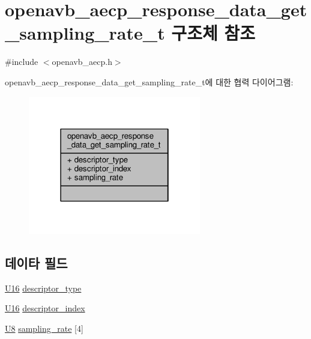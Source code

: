 \hypertarget{structopenavb__aecp__response__data__get__sampling__rate__t}{}\section{openavb\+\_\+aecp\+\_\+response\+\_\+data\+\_\+get\+\_\+sampling\+\_\+rate\+\_\+t 구조체 참조}
\label{structopenavb__aecp__response__data__get__sampling__rate__t}


{\ttfamily \#include $<$openavb\+\_\+aecp.\+h$>$}



openavb\+\_\+aecp\+\_\+response\+\_\+data\+\_\+get\+\_\+sampling\+\_\+rate\+\_\+t에 대한 협력 다이어그램\+:
\nopagebreak
\begin{figure}[H]
\begin{center}
\leavevmode
\includegraphics[width=214pt]{structopenavb__aecp__response__data__get__sampling__rate__t__coll__graph}
\end{center}
\end{figure}
\subsection*{데이타 필드}
\begin{DoxyCompactItemize}
\item 
\hyperlink{openavb__types__base__pub_8h_a0a0a322d5fa4a546d293a77ba8b4a71f}{U16} \hyperlink{structopenavb__aecp__response__data__get__sampling__rate__t_a1e231d7874aada5925b29affc76782cc}{descriptor\+\_\+type}
\item 
\hyperlink{openavb__types__base__pub_8h_a0a0a322d5fa4a546d293a77ba8b4a71f}{U16} \hyperlink{structopenavb__aecp__response__data__get__sampling__rate__t_ab26fb363c24b9a2a4391f9171c981b08}{descriptor\+\_\+index}
\item 
\hyperlink{openavb__types__base__pub_8h_aa63ef7b996d5487ce35a5a66601f3e73}{U8} \hyperlink{structopenavb__aecp__response__data__get__sampling__rate__t_a6b09041f69d1e15bd5278514758e680a}{sampling\+\_\+rate} \mbox{[}4\mbox{]}
\end{DoxyCompactItemize}


